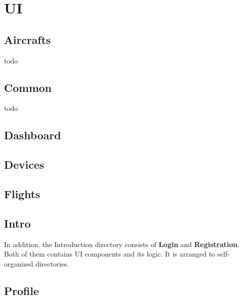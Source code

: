 \section{UI}\label{sec:ui}

\subsection{Aircrafts}\label{subsec:aircrafts}
todo

\subsection{Common}\label{subsec:common}
todo

\subsection{Dashboard}\label{subsec:dashboard}

\subsection{Devices}\label{subsec:devices}

\subsection{Flights}\label{subsec:flights}

\subsection{Intro}\label{subsec:intro}
In addition, the Introduction directory consists of \textbf{Login} and \textbf{Registration}.
Both of them contains UI components and its logic.
It is arranged to self-organized directories.

\subsection{Profile}\label{subsec:profile}
